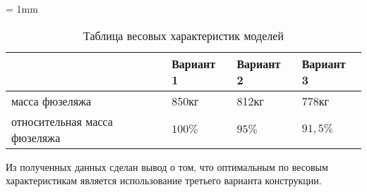 \tabulinesep = 1mm
\begin{table}[H]
\captionsetup{justification=centering}
\caption{Таблица весовых характеристик моделей}
\begin{tabu}to 
\hline
{}
 & Вариант 1 & Вариант 2 & Вариант 3 \\ \hline
масса фюзеляжа & 850кг & 812кг  & 778кг \\ \hline
относительная масса фюзеляжа & $100\%$ & $95\%$ & $91,5\%$ \\ \hline
\end{tabu}
\label{tab:variantsMasses}
\end{table}

Из полученных данных сделан вывод о том, что оптимальным по весовым характеристикам является использование третьего варианта конструкции.  

